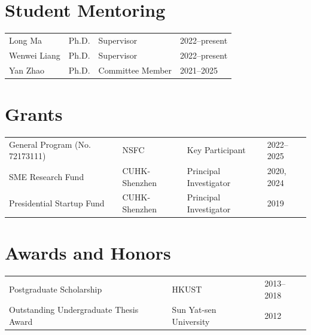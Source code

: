 \documentclass[11pt]{res}
\begin{document}
\begin{resume}
\pagebreak
\section{\bf Student Mentoring}
\vspace{0.1in}
\begin{tabular}{llll}
\hspace{-0.42in} Long Ma      & Ph.D. & Supervisor       & 2022--present\\
\hspace{-0.42in} Wenwei Liang & Ph.D. & Supervisor       & 2022--present\\
\hspace{-0.42in} Yan Zhao     & Ph.D. & Committee Member & 2021--2025
\end{tabular}

\section{\bf Grants}
\vspace{0.1in}
\begin{tabular}{llll}
\hspace{-0.42in} General Program (No. 72173111)
  & NSFC & Key Participant & 2022--2025\\
\hspace{-0.42in} SME Research Fund
  & CUHK-Shenzhen & Principal Investigator & 2020, 2024\\
\hspace{-0.42in} Presidential Startup Fund
  & CUHK-Shenzhen & Principal Investigator & 2019
\end{tabular}

\section{\bf Awards and Honors}
\vspace{0.1in}
\begin{tabular}{lll}
\hspace{-0.42in} Postgraduate Scholarship
  & HKUST & 2013--2018\\
\hspace{-0.42in} Outstanding Undergraduate Thesis Award
  & Sun Yat-sen University & 2012
\end{tabular}


\end{resume}
\end{document}
